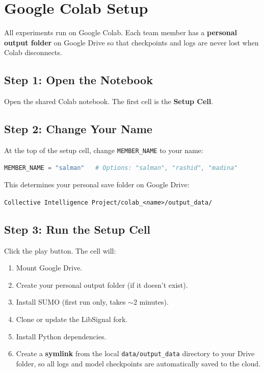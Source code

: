 \documentclass[11pt,a4paper]{article}
\begin{document}
\section{Google Colab Setup}

All experiments run on Google Colab.  Each team member has a \textbf{personal output folder} on Google Drive so that checkpoints and logs are never lost when Colab disconnects.

\subsection{Step 1: Open the Notebook}

Open the shared Colab notebook.  The first cell is the \textbf{Setup Cell}.

\subsection{Step 2: Change Your Name}

At the top of the setup cell, change \texttt{MEMBER\_NAME} to your name:

\begin{lstlisting}[language=Python]
MEMBER_NAME = "salman"   # Options: "salman", "rashid", "madina"
\end{lstlisting}

This determines your personal save folder on Google Drive:
\begin{center}
\texttt{Collective Intelligence Project/colab\_\textit{<name>}/output\_data/}
\end{center}

\subsection{Step 3: Run the Setup Cell}

Click the play button.  The cell will:
\begin{enumerate}
    \item Mount Google Drive.
    \item Create your personal output folder (if it doesn't exist).
    \item Install SUMO (first run only, takes $\sim$2 minutes).
    \item Clone or update the LibSignal fork.
    \item Install Python dependencies.
    \item Create a \textbf{symlink} from the local \texttt{data/output\_data} directory to your Drive folder, so all logs and model checkpoints are automatically saved to the cloud.
\end{enumerate}
\end{document}
